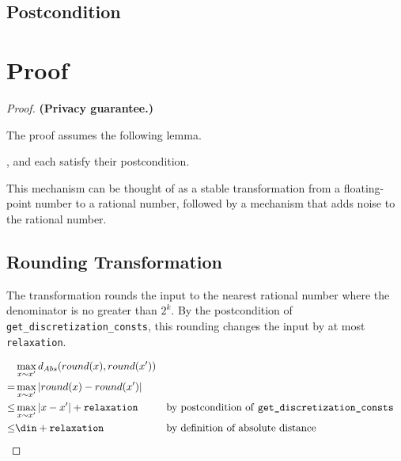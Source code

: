 \documentclass{article}
\begin{document}
\subsection*{Postcondition}


\section{Proof}

\begin{proof} 
\textbf{(Privacy guarantee.)} 
    
\begin{tcolorbox}
    The proof assumes the following lemma.
    \begin{lemma}
        , 
         and 
         each satisfy their postcondition.
    \end{lemma}
\end{tcolorbox}

This mechanism can be thought of as a stable transformation from a floating-point number to a rational number,
followed by a mechanism that adds noise to the rational number.

\subsection{Rounding Transformation}

The transformation rounds the input to the nearest rational number where the denominator is no greater than $2^k$.
By the postcondition of \texttt{get\_discretization\_consts}, this rounding changes the input by at most \texttt{relaxation}.

\begin{align*}
    &\max_{x \sim x'} d_{Abs}(round(x), round(x')) \\
    =& \max_{x \sim x'} \left| round(x) - round(x') \right| \\
    \leq& \max_{x \sim x'} \left| x - x' \right| + \texttt{relaxation} &&\text{by postcondition of \texttt{get\_discretization\_consts}} \\
    \leq& \din + \texttt{relaxation} &&\text{by definition of absolute distance}
\end{align*}


\end{proof}
\end{document}
